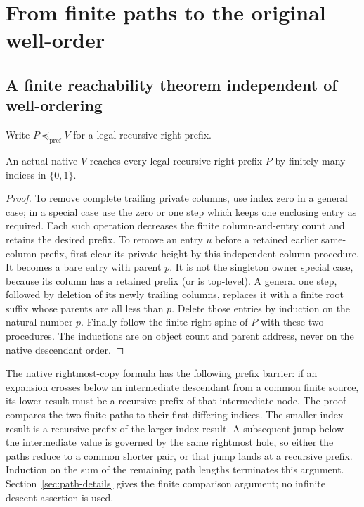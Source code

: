 \section{From finite paths to the original well-order}\label{ch:rank}

\subsection{A finite reachability theorem independent of well-ordering}
Write $P\preceq_{\mathrm{pref}}V$ for a legal recursive right prefix.

\begin{lemma}\label{lem:prefix-path}
An actual native $V$ reaches every legal recursive right prefix $P$
by finitely many indices in $\{0,1\}$.
\end{lemma}
\begin{proof}
To remove complete trailing private columns, use index zero in a
general case; in a special case use the zero or one step which keeps
one enclosing entry as required. Each such operation decreases the
finite column-and-entry count and retains the desired prefix.
To remove an entry $u$ before a retained earlier same-column
prefix, first clear its private height by this independent column
procedure. It becomes a bare entry with parent $p$. It is not the
singleton owner special case, because its column has a retained
prefix (or is top-level). A general one step, followed by deletion
of its newly trailing columns, replaces it with a finite root
suffix whose parents are all less than $p$. Delete those entries
by induction on the natural number $p$. Finally follow the finite
right spine of $P$ with these two procedures. The inductions are
on object count and parent address, never on the native descendant
order. 
\end{proof}

The native rightmost-copy formula has the following prefix barrier:
if an expansion crosses below an intermediate descendant from a
common finite source, its lower result must be a recursive prefix
of that intermediate node. The proof compares the two finite paths
to their first differing indices. The smaller-index result is a
recursive prefix of the larger-index result. A subsequent jump
below the intermediate value is governed by the same rightmost
hole, so either the paths reduce to a common shorter pair, or that
jump lands at a recursive prefix. Induction on the sum of the
remaining path lengths terminates this argument. Section~\ref{sec:path-details} gives the finite comparison argument;
no infinite descent assertion is used.

